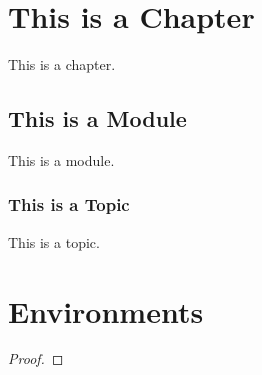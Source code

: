 \documentclass[12pt]{notex}
\author{User}
\date{\today}
\begin{document}
\maketitle

\section{This is a Chapter}

This is a chapter.

\subsection{This is a Module}

This is a module.

\subsubsection{This is a Topic}

This is a topic.

\section{Environments}

\begin{theorem}
    \lipsum[1]
\end{theorem}

\begin{proof}
    \lipsum[2]
\end{proof}

\begin{lemma}
    \lipsum[3]
\end{lemma}

\begin{corollary}
    \lipsum[4]
\end{corollary}

\begin{proposition}
    \lipsum[5]
\end{proposition}

\begin{statement*} %
    \lipsum[6]
\end{statement*}

\begin{conjecture*}
    \lipsum[7]
\end{conjecture*}

\begin{definition**} %
    \lipsum[8]
\end{definition**}
\end{document}
